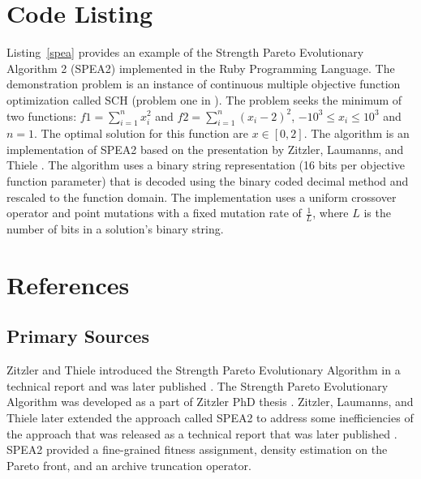 \documentclass[a4paper, 11pt]{article}
\begin{document}
\section{Code Listing}
\label{sec:code}
Listing~\ref{spea} provides an example of the Strength Pareto Evolutionary Algorithm 2 (SPEA2) implemented in the Ruby Programming Language.
The demonstration problem is an instance of continuous multiple objective function optimization called SCH (problem one in \cite{Deb2002}). The problem seeks the minimum of two functions: $f1=\sum_{i=1}^n x_{i}^2$ and $f2=\sum_{i=1}^n (x_{i}-2)^2$, $-10^3\leq x_i \leq 10^3$ and $n=1$. The optimal solution for this function are $x \in [0,2]$.
The algorithm is an implementation of SPEA2 based on the presentation by Zitzler, Laumanns, and Thiele \cite{Zitzler2002}.
The algorithm uses a binary string representation (16 bits per objective function parameter) that is decoded using the binary coded decimal method and rescaled to the function domain. The implementation uses a uniform crossover operator and point mutations with a fixed mutation rate of $\frac{1}{L}$, where $L$ is the number of bits in a solution's binary string. 



\section{References}
\label{sec:references}

% 
% 
\subsection{Primary Sources}
Zitzler and Thiele introduced the Strength Pareto Evolutionary Algorithm in a technical report \cite{Zitzler1998} and was later published \cite{Zitzler1999}.
The Strength Pareto Evolutionary Algorithm was developed as a part of Zitzler PhD thesis \cite{Zitzler1999a}.
Zitzler, Laumanns, and Thiele later extended the approach called SPEA2 to address some inefficiencies of the approach that was released as a technical report \cite{Zitzler2001} that was later published \cite{Zitzler2002}. SPEA2 provided a fine-grained fitness assignment, density estimation on the Pareto front, and an archive truncation operator.
\end{document}
